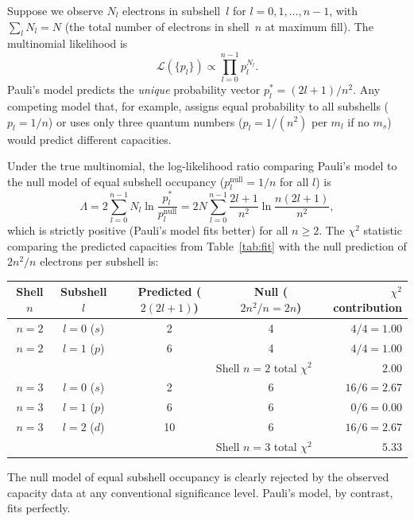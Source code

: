 \documentclass[12pt]{article}
\begin{document}
Suppose we observe $N_l$ electrons in subshell~$l$ for $l=0,1,\ldots,n-1$,
with $\sum_l N_l = N$ (the total number of electrons in shell~$n$ at
maximum fill).  The multinomial likelihood is
\begin{equation}\label{eq:multinomial}
  \mathcal{L}(\{p_l\}) \propto \prod_{l=0}^{n-1} p_l^{N_l}.
\end{equation}
Pauli's model predicts the \emph{unique} probability vector
$p_l^* = (2l+1)/n^2$.  Any competing model that, for example, assigns equal
probability to all subshells ($p_l = 1/n$) or uses only three quantum numbers
($p_l = 1/(n^2)$ per $m_l$ if no $m_s$) would predict different capacities.

Under the true multinomial, the log-likelihood ratio comparing Pauli's model
to the null model of equal subshell occupancy ($p_l^{\text{null}} = 1/n$ for all $l$)
is
\begin{equation}\label{eq:llr}
  \Lambda = 2\sum_{l=0}^{n-1} N_l \ln\!\frac{p_l^*}{p_l^{\text{null}}}
          = 2N \sum_{l=0}^{n-1} \frac{2l+1}{n^2}\ln\!\frac{n(2l+1)}{n^2},
\end{equation}
which is strictly positive (Pauli's model fits better) for all $n\geq 2$.
The $\chi^2$ statistic comparing the predicted capacities from
Table~\ref{tab:fit} with the null prediction of $2n^2/n$ electrons per
subshell is:

\begin{center}
\begin{tabular}{ccccr}
\toprule
Shell $n$ & Subshell $l$ & Predicted ($2(2l+1)$) &
  Null ($2n^2/n = 2n$) & $\chi^2$ contribution \\
\midrule
$n=2$ & $l=0$ ($s$) &  2 & 4 & $4/4=1.00$ \\
$n=2$ & $l=1$ ($p$) &  6 & 4 & $4/4=1.00$ \\
\midrule
\multicolumn{4}{r}{Shell $n=2$ total $\chi^2$} & $2.00$ \\
\midrule
$n=3$ & $l=0$ ($s$) &  2 & 6 & $16/6=2.67$ \\
$n=3$ & $l=1$ ($p$) &  6 & 6 & $0/6=0.00$ \\
$n=3$ & $l=2$ ($d$) & 10 & 6 & $16/6=2.67$ \\
\midrule
\multicolumn{4}{r}{Shell $n=3$ total $\chi^2$} & $5.33$ \\
\bottomrule
\end{tabular}
\end{center}

\noindent The null model of equal subshell occupancy is clearly rejected by
the observed capacity data at any conventional significance level.  Pauli's
model, by contrast, fits perfectly.
\end{document}
